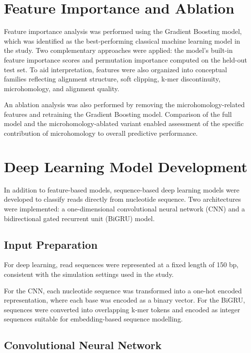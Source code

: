 \section{Feature Importance and Ablation}

Feature importance analysis was performed using the Gradient Boosting model, which was identified as the best-performing classical machine learning model in the study. Two complementary approaches were applied: the model’s built-in feature importance scores and permutation importance computed on the held-out test set. To aid interpretation, features were also organized into conceptual families reflecting alignment structure, soft clipping, k-mer discontinuity, microhomology, and alignment quality.

An ablation analysis was also performed by removing the microhomology-related features and retraining the Gradient Boosting model. Comparison of the full model and the microhomology-ablated variant enabled assessment of the specific contribution of microhomology to overall predictive performance.

\section{Deep Learning Model Development}

In addition to feature-based models, sequence-based deep learning models were developed to classify reads directly from nucleotide sequence. Two architectures were implemented: a one-dimensional convolutional neural network (CNN) and a bidirectional gated recurrent unit (BiGRU) model.

\subsection{Input Preparation}

For deep learning, read sequences were represented at a fixed length of 150 bp, consistent with the simulation settings used in the study.

For the CNN, each nucleotide sequence was transformed into a one-hot encoded representation, where each base was encoded as a binary vector. For the BiGRU, sequences were converted into overlapping k-mer tokens and encoded as integer sequences suitable for embedding-based sequence modelling.

\subsection{Convolutional Neural Network}

